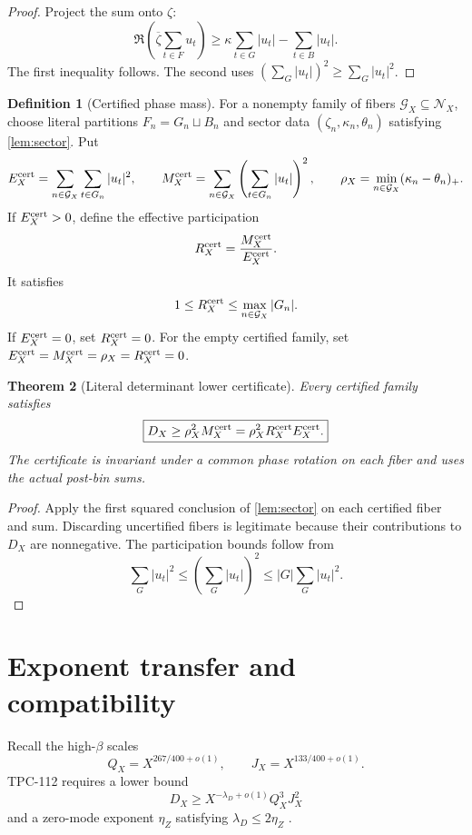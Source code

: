 \documentclass[11pt]{article}
\newtheorem{theorem}{Theorem}[section]
\theoremstyle{definition}
\newtheorem{definition}[theorem]{Definition}
\theoremstyle{remark}
\newcommand{\cN}{\mathcal N}
\newcommand{\cG}{\mathcal G}
\begin{document}
\begin{proof}
Project the sum onto \(\zeta\):
\[
 \Re\left(\overline\zeta\sum_{t\in F}u_t\right)
 \ge
 \kappa\sum_{t\in G}|u_t|
 -\sum_{t\in B}|u_t|.
\]
The first inequality follows.  The second uses
\((\sum_{G}|u_t|)^2\ge\sum_G|u_t|^2\).
\end{proof}

\begin{definition}[Certified phase mass]
For a nonempty family of fibers \(\cG_X\subseteq\cN_X\), choose literal
partitions \(F_n=G_n\sqcup B_n\) and sector data
\((\zeta_n,\kappa_n,\theta_n)\) satisfying
\cref{lem:sector}.  Put
\[
 E_X^{\rm cert}=\sum_{n\in\cG_X}\sum_{t\in G_n}|u_t|^2,
 \qquad
 M_X^{\rm cert}
 =\sum_{n\in\cG_X}
 \left(\sum_{t\in G_n}|u_t|\right)^2,
 \qquad
 \rho_X=\min_{n\in\cG_X}(\kappa_n-\theta_n)_+.
\]
If \(E_X^{\rm cert}>0\), define the effective participation
\[
 R_X^{\rm cert}=\frac{M_X^{\rm cert}}{E_X^{\rm cert}}.
\]
It satisfies
\[
 1\le R_X^{\rm cert}\le
 \max_{n\in\cG_X}|G_n|.
\]
If \(E_X^{\rm cert}=0\), set \(R_X^{\rm cert}=0\).
For the empty certified family, set
\(E_X^{\rm cert}=M_X^{\rm cert}=\rho_X=R_X^{\rm cert}=0\).
\end{definition}

\begin{theorem}[Literal determinant lower certificate]
\label{thm:certificate}
Every certified family satisfies
\[
 \boxed{
 D_X\ge\rho_X^2M_X^{\rm cert}
 =\rho_X^2R_X^{\rm cert}E_X^{\rm cert}.}
\]
The certificate is invariant under a common phase rotation on each
fiber and uses the actual post-bin sums.
\end{theorem}

\begin{proof}
Apply the first squared conclusion of \cref{lem:sector} on each
certified fiber and sum.  Discarding uncertified fibers is legitimate
because their contributions to \(D_X\) are nonnegative.  The
participation bounds follow from
\[
 \sum_G|u_t|^2\le
 \left(\sum_G|u_t|\right)^2
 \le |G|\sum_G|u_t|^2.
\]
\end{proof}

\section{Exponent transfer and compatibility}

Recall the high-\(\beta\) scales
\[
 Q_X=X^{267/400+o(1)},\qquad
 J_X=X^{133/400+o(1)}.
\]
TPC-112 requires a lower bound
\[
 D_X\ge X^{-\lambda_D+o(1)}Q_X^3J_X^2
\]
and a zero-mode exponent \(\eta_Z\) satisfying
\(\lambda_D\le2\eta_Z\) \citep{WangTPC112}.
\end{document}
